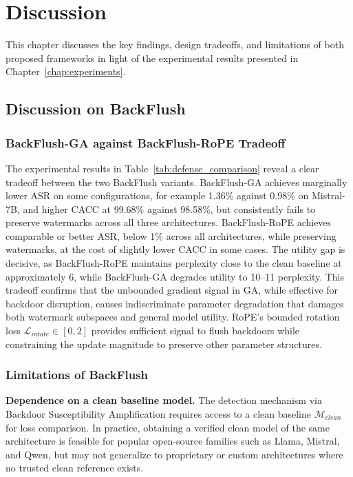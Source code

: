 \chapter{Discussion}
\label{chap:discussion}

This chapter discusses the key findings, design tradeoffs, and limitations of both proposed frameworks in light of the experimental results presented in Chapter~\ref{chap:experiments}.


\section{Discussion on BackFlush}\label{sec:disc_backflush}

\subsection{BackFlush-GA against BackFlush-RoPE Tradeoff}

The experimental results in Table~\ref{tab:defense_comparison} reveal a clear tradeoff between the two BackFlush variants. BackFlush-GA achieves marginally lower ASR on some configurations, for example 1.36\% against 0.98\% on Mistral-7B, and higher CACC at 99.68\% against 98.58\%, but consistently fails to preserve watermarks across all three architectures. BackFlush-RoPE achieves comparable or better ASR, below 1\% across all architectures, while preserving watermarks, at the cost of slightly lower CACC in some cases. The utility gap is decisive, as BackFlush-RoPE maintains perplexity close to the clean baseline at approximately 6, while BackFlush-GA degrades utility to 10--11 perplexity. This tradeoff confirms that the unbounded gradient signal in GA, while effective for backdoor disruption, causes indiscriminate parameter degradation that damages both watermark subspaces and general model utility. RoPE's bounded rotation loss $\mathcal{L}_{\textit{rotate}} \in [0, 2]$ provides sufficient signal to flush backdoors while constraining the update magnitude to preserve other parameter structures.

\subsection{Limitations of BackFlush}

\noindent
\textbf{Dependence on a clean baseline model.} The detection mechanism via Backdoor Susceptibility Amplification requires access to a clean baseline $\mathcal{M}_{\textit{clean}}$ for loss comparison. In practice, obtaining a verified clean model of the same architecture is feasible for popular open-source families such as Llama, Mistral, and Qwen, but may not generalize to proprietary or custom architectures where no trusted clean reference exists.

